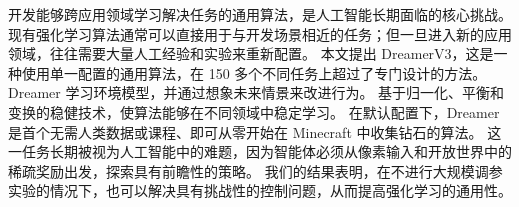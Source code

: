 开发能够跨应用领域学习解决任务的通用算法，是人工智能长期面临的核心挑战。
现有强化学习算法通常可以直接用于与开发场景相近的任务；但一旦进入新的应用领域，往往需要大量人工经验和实验来重新配置。
本文提出 DreamerV3，这是一种使用单一配置的通用算法，在 150 多个不同任务上超过了专门设计的方法。
Dreamer 学习环境模型，并通过想象未来情景来改进行为。
基于归一化、平衡和变换的稳健技术，使算法能够在不同领域中稳定学习。
在默认配置下，Dreamer 是首个无需人类数据或课程、即可从零开始在 Minecraft 中收集钻石的算法。
这一任务长期被视为人工智能中的难题，因为智能体必须从像素输入和开放世界中的稀疏奖励出发，探索具有前瞻性的策略。
我们的结果表明，在不进行大规模调参实验的情况下，也可以解决具有挑战性的控制问题，从而提高强化学习的通用性。
